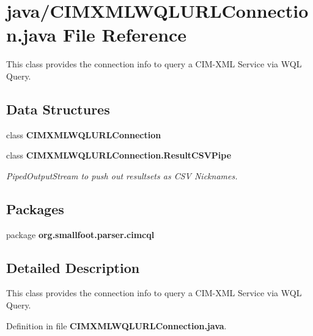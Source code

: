 \section{java/\+C\+I\+M\+X\+M\+L\+W\+Q\+L\+U\+R\+L\+Connection.java File Reference}
\label{CIMXMLWQLURLConnection_8java}


This class provides the connection info to query a C\+I\+M-\/\+X\+M\+L Service via W\+Q\+L Query.  


\subsection*{Data Structures}
\begin{DoxyCompactItemize}
\item 
class {\bf C\+I\+M\+X\+M\+L\+W\+Q\+L\+U\+R\+L\+Connection}
\item 
class {\bf C\+I\+M\+X\+M\+L\+W\+Q\+L\+U\+R\+L\+Connection.\+Result\+C\+S\+V\+Pipe}
\begin{DoxyCompactList}\small\item\em Piped\+Output\+Stream to push out resultsets as C\+S\+V Nicknames. \end{DoxyCompactList}\end{DoxyCompactItemize}
\subsection*{Packages}
\begin{DoxyCompactItemize}
\item 
package {\bf org.\+smallfoot.\+parser.\+cimcql}
\end{DoxyCompactItemize}


\subsection{Detailed Description}
This class provides the connection info to query a C\+I\+M-\/\+X\+M\+L Service via W\+Q\+L Query. 



Definition in file {\bf C\+I\+M\+X\+M\+L\+W\+Q\+L\+U\+R\+L\+Connection.\+java}.

